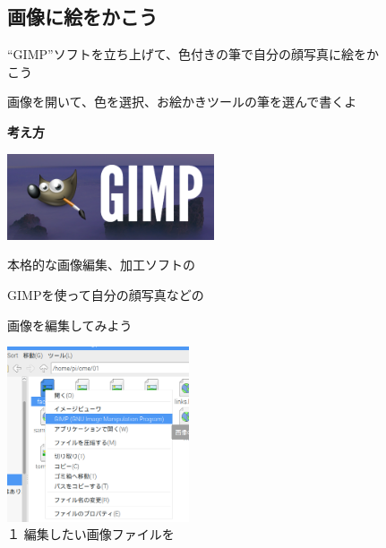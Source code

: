 \documentclass[a4paper,12pt]{jarticle}
\begin{document}
\begin{figure}[ht]
  \subsection{\theExercise 画像に絵をかこう}

  \bigskip

  “GIMP”ソフトを立ち上げて、色付きの筆で自分の顔写真に絵をかこう

  画像を開いて、色を選択、お絵かきツールの筆を選んで書くよ

  \textbf{考え方}



  \begin{minipage}{\textwidth}
    \centering
    \includegraphics[width=6.112cm]{textbook-img123.png}
    \begin{minipage}[b]{8.617cm}

      本格的な画像編集、加工ソフトの

      GIMPを使って自分の顔写真などの

      画像を編集してみよう
    \end{minipage}


  \end{minipage}
  \bigskip




  \begin{minipage}{\textwidth}
    \centering
    \begin{minipage}{5.852cm}
      \includegraphics[width=5.359cm]{textbook-img124.png}\\
      １ 編集したい画像ファイルを


\end{minipage}
\end{minipage}
\end{figure}
\end{document}
